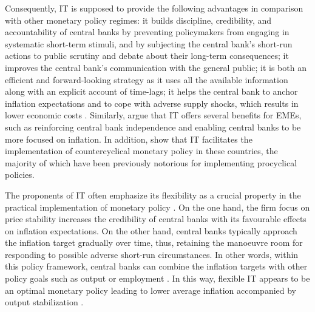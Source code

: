 \documentclass{article}
\begin{document}
Consequently, IT is supposed to provide the following advantages in comparison with other monetary policy regimes: it builds discipline, credibility, and accountability of central banks by preventing policymakers from engaging in systematic short-term stimuli, and by subjecting the central bank’s short-run actions to public scrutiny and debate about their long-term consequences; it improves the central bank’s communication with the general public; it is both an efficient and forward-looking strategy as it uses all the available information along with an explicit account of time-lags; it helps the central bank to anchor inflation expectations and to cope with adverse supply shocks, which results in lower economic costs \citep{Batini2007, Bernanke1997, Mishkin2000}. Similarly, \citet{mishkin2002} argue that IT offers several benefits for EMEs, such as reinforcing central bank independence and enabling central banks to be more focused on inflation. In addition, \citet{thornton2017} show that IT facilitates the implementation of countercyclical monetary policy in these countries, the majority of which have been previously notorious for implementing procyclical policies.

The proponents of IT often emphasize its flexibility as a crucial property in the practical implementation of monetary policy \citep{mishkin1999}. On the one hand, the firm focus on price stability increases the credibility of central banks with its favourable effects on inflation expectations. On the other hand, central banks typically approach the inflation target gradually over time, thus, retaining the manoeuvre room for responding to possible adverse short-run circumstances. In other words, within this policy framework, central banks can combine the inflation targets with other policy goals such as output or employment \citep{agenor2002, Leiderman1995, Svensson1997a}. In this way, flexible IT appears to be an optimal monetary policy leading to lower average inflation accompanied by output stabilization \citep{Ball1999a, Ball1999b, Clarida1999, Svensson1997b}.
\end{document}
